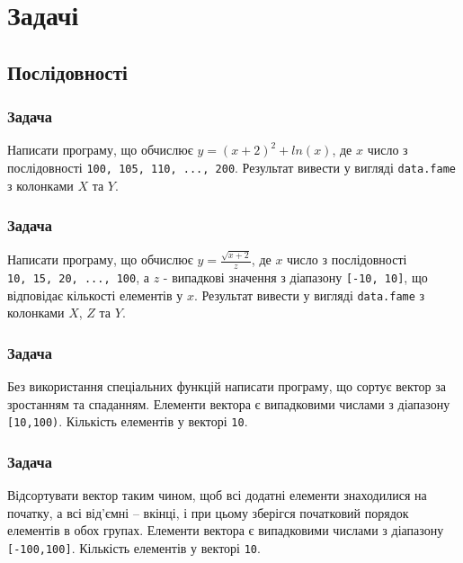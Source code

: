 \documentclass[
]{book}
\begin{document}
\hypertarget{chapter61}{%
\section{Задачі}\label{chapter61}}

\hypertarget{chapter611}{%
\subsection{Послідовності}\label{chapter611}}

\hypertarget{task6111}{%
\subsubsection{Задача}\label{task6111}}

Написати програму, що обчислює \(y = (x+2)^2 + ln(x)\), де \(x\) число з послідовності \texttt{100,\ 105,\ 110,\ ...,\ 200}. Результат вивести у вигляді \texttt{data.fame} з колонками \(X\) та \(Y\).

\hypertarget{task6112}{%
\subsubsection{Задача}\label{task6112}}

Написати програму, що обчислює \(y = \frac{\sqrt{x+2}}{z}\), де \(x\) число з послідовності \texttt{10,\ 15,\ 20,\ ...,\ 100}, а \(z\) - випадкові значення з діапазону \texttt{{[}-10,\ 10{]}}, що відповідає кількості елементів у \(x\). Результат вивести у вигляді \texttt{data.fame} з колонками \(X\), \(Z\) та \(Y\).

\hypertarget{task6113}{%
\subsubsection{Задача}\label{task6113}}

Без використання спеціальних функцій написати програму, що сортує вектор за зростанням та спаданням. Елементи вектора є випадковими числами з діапазону \texttt{{[}10,100)}. Кількість елементів у векторі \texttt{10}.

\hypertarget{task6114}{%
\subsubsection{Задача}\label{task6114}}

Відсортувати вектор таким чином, щоб всі додатні елементи знаходилися на початку, а всі від'ємні -- вкінці, і при цьому зберігся початковий порядок елементів в обох групах. Елементи вектора є випадковими числами з діапазону \texttt{{[}-100,100{]}}. Кількість елементів у векторі \texttt{10}.
\end{document}
